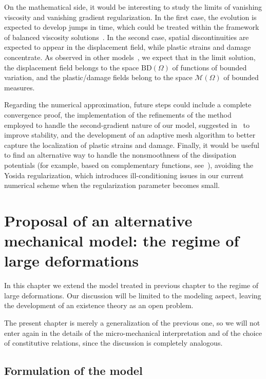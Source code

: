 \documentclass[a4paper,10pt,twoside]{amsbook}
\numberwithin{section}{chapter}
\numberwithin{equation}{chapter}
\theoremstyle{definition}
\begin{document}
On the mathematical side, it would be interesting to study the limits of vanishing viscosity and vanishing gradient regularization. In the first case, the evolution is expected to develop jumps in time, which could be treated within the framework of balanced viscosity solutions~\cite{MieRosSav13}. In the second case, spatial discontinuities are expected to appear in the displacement field, while plastic strains and damage concentrate. As observed in other models~\cite{daldessol09,CriRos21}, we expect that in the limit solution, the displacement field belongs to the space $\text{BD}(\Omega)$ of functions of bounded variation, and the plastic/damage fields belong to the space $\mathcal{M}(\Omega)$ of bounded measures.

Regarding the numerical approximation, future steps could include a complete convergence proof, the implementation of the refinements of the method employed to handle the second-gradient nature of our model, suggested in~\cite{engel2002continuous} to improve stability, and the development of an adaptive mesh algorithm to better capture the localization of plastic strains and damage. Finally, it would be useful to find an alternative way to handle the nonsmoothness of the dissipation potentials (for example, based on complementary functions, see~\cite{lewandowski2023multifield}), avoiding the Yosida regularization, which introduces ill-conditioning issues in our current numerical scheme when the regularization parameter becomes small.

\chapter{Proposal of an alternative mechanical model: the regime of large deformations}
\label{chap:pressure-sensitive-large}

In this chapter we extend the model treated in previous chapter to the regime of large deformations. Our discussion will be limited to the modeling aspect, leaving the development of an existence theory as an open problem.

The present chapter is merely a generalization of the previous one, so we will not enter again in the details of the micro-mechanical interpretation and of the choice of constitutive relations, since the discussion is completely analogous.

\section{Formulation of the model}
\end{document}
